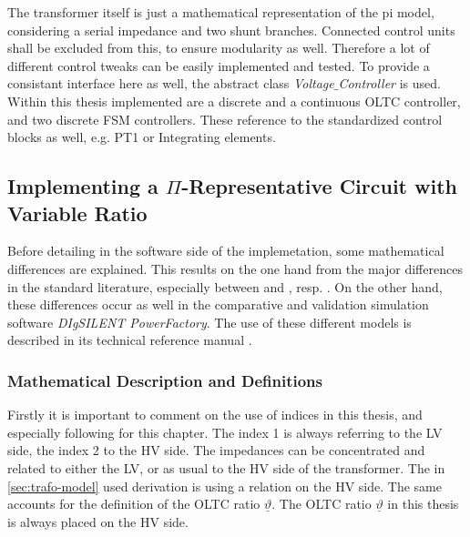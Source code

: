 The transformer itself is just a mathematical representation of the pi model, considering a serial impedance and two shunt branches.
Connected control units shall be excluded from this, to ensure modularity as well. 
Therefore a lot of different control tweaks can be easily implemented and tested.
To provide a consistant interface here as well, the abstract class \textit{Voltage$\_$Controller} is used.
Within this thesis implemented are a discrete and a continuous \acs{OLTC} controller, and two discrete \acs{FSM} controllers.
These reference to the standardized control blocks as well, e.g. PT1 or Integrating elements.

\subsection{Implementing a \texorpdfstring{$\Pi{}$}{}-Representative Circuit with Variable Ratio}

Before detailing in the software side of the implemetation, some mathematical differences are explained.
This results on the one hand from the major differences in the standard literature, especially between \textcite{machowski_2020} and \textcite{kundur_2022}, resp. \textcite{milano_2010}.
On the other hand, these differences occur as well in the comparative and validation simulation software \textit{DIgSILENT PowerFactory}.
The use of these different models is described in its technical reference manual \quelle. 

\subsubsection{Mathematical Description and Definitions}

Firstly it is important to comment on the use of indices in this thesis, and especially following for this chapter.
The index 1 is always referring to the \acs{LV} side, the index 2 to the \acs{HV} side. 
The impedances can be concentrated and related to either the \acs{LV}, or as usual to the \acs{HV} side of the transformer. 
The in \autoref{sec:trafo-model} used derivation is using a relation on the \acs{HV} side.
The same accounts for the definition of the \acs{OLTC} ratio $\underline{\vartheta}$.     
The \acs{OLTC} ratio $\underline{\vartheta}$ in this thesis is always placed on the HV side.

